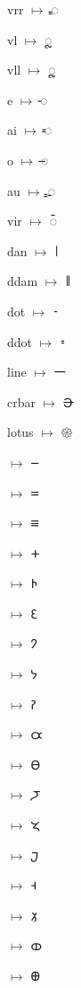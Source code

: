 {\noindent vrr $\mapsto$ {\brfont 𑀿}\par
\noindent vl $\mapsto$ {\brfont 𑁀}\par
\noindent vll $\mapsto$ {\brfont 𑁁}\par
\noindent e $\mapsto$ {\brfont 𑁂}\par
\noindent ai $\mapsto$ {\brfont 𑁃}\par
\noindent o $\mapsto$ {\brfont 𑁄}\par
\noindent au $\mapsto$ {\brfont 𑁅}\par
\noindent vir $\mapsto$ {\brfont 𑁆}\par
\noindent dan $\mapsto$ {\brfont 𑁇}\par
\noindent ddam $\mapsto$ {\brfont 𑁈}\par
\noindent dot $\mapsto$ {\brfont 𑁉}\par
\noindent ddot $\mapsto$ {\brfont 𑁊}\par
\noindent line $\mapsto$ {\brfont 𑁋}\par
\noindent crbar $\mapsto$ {\brfont 𑁌}\par
\noindent lotus $\mapsto$ {\brfont 𑁍}\par
{} $\mapsto$ {\brfont 𑁒}\par
{} $\mapsto$ {\brfont 𑁓}\par
{} $\mapsto$ {\brfont 𑁔}\par
{} $\mapsto$ {\brfont 𑁕}\par
{} $\mapsto$ {\brfont 𑁖}\par
{} $\mapsto$ {\brfont 𑁗}\par
{} $\mapsto$ {\brfont 𑁘}\par
{} $\mapsto$ {\brfont 𑁙}\par
{} $\mapsto$ {\brfont 𑁚}\par
{} $\mapsto$ {\brfont 𑁛}\par
{} $\mapsto$ {\brfont 𑁜}\par
{} $\mapsto$ {\brfont 𑁝}\par
{} $\mapsto$ {\brfont 𑁞}\par
{} $\mapsto$ {\brfont 𑁟}\par
{} $\mapsto$ {\brfont 𑁠}\par
{} $\mapsto$ {\brfont 𑁡}\par
{} $\mapsto$ {\brfont 𑁢}\par
{} $\mapsto$ {\brfont 𑁣}\par
}
